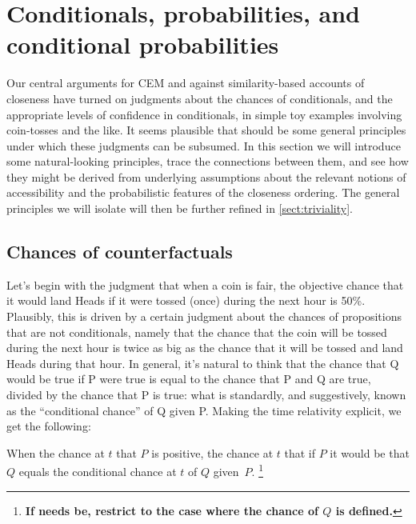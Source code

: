 \documentclass[If.tex]{subfiles}
\begin{document}
\chapter{Conditionals, probabilities, and conditional probabilities}
\label{chap:prob}
\label{sect:equations}
Our central arguments for CEM and against similarity-based accounts of closeness have turned on judgments about the chances of conditionals, and the appropriate levels of confidence in conditionals, in simple toy examples involving coin-tosses and the like. It seems plausible that should be some general principles under which these judgments can be subsumed. In this section we will introduce some natural-looking principles, trace the connections between them, and see how they might be derived from underlying assumptions about the relevant notions of accessibility and the probabilistic features of the closeness ordering. The general principles we will isolate will then be further refined in \autoref{sect:triviality}.

\section{Chances of counterfactuals}\label{sect:chance}
Let's begin with the judgment that when a coin is fair, the objective chance that it would land Heads if it were tossed (once) during the next hour is 50\%. Plausibly, this is driven by a certain judgment about the chances of propositions that are not conditionals, namely that the chance that the coin will be tossed during the next hour is twice as big as the chance that it will be tossed and land Heads during that hour. In general, it's natural to think that the chance that Q would be true if P were true is equal to the chance that P and Q are true, divided by the chance that P is true: what is standardly, and suggestively, known as the “conditional chance” of Q given P. Making the time relativity explicit, we get the following:
\begin{prop}
	 \label{chanceq}
	When the chance at $t$ that $P$ is positive, the chance at $t$ that if $P$ it would be that $Q$ equals the conditional chance at $t$ of $Q$ given~$P$.%
	\footnote{\textbf{If needs be, restrict to the case where the chance of $Q$ is defined.}}
\end{prop}
\end{document}
